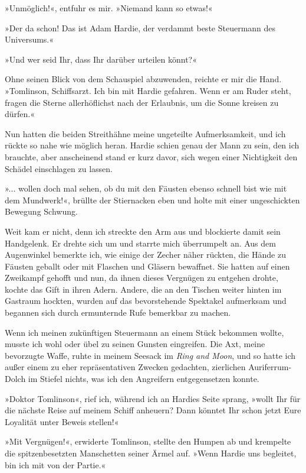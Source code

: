 »Unmöglich!«, entfuhr es mir. »Niemand kann so etwas!«

»Der da schon! Das ist Adam Hardie, der verdammt beste Steuermann
des Universums.«

»Und wer seid Ihr, dass Ihr darüber urteilen könnt?«

Ohne seinen Blick von dem Schauspiel abzuwenden, reichte er mir die
Hand. »Tomlinson, Schiffsarzt. Ich bin mit Hardie gefahren. Wenn er
am Ruder steht, fragen die Sterne allerhöflichst nach der
Erlaubnis, um die Sonne kreisen zu dürfen.«

\bigpar

Nun hatten die beiden Streithähne meine ungeteilte Aufmerksamkeit,
und ich rückte so nahe wie möglich heran. Hardie schien genau der
Mann zu sein, den ich brauchte, aber anscheinend stand er kurz
davor, sich wegen einer Nichtigkeit den Schädel einschlagen zu
lassen.

»... wollen doch mal sehen, ob du mit den Fäusten ebenso schnell
bist wie mit dem Mundwerk!«, brüllte der Stiernacken eben und holte
mit einer ungeschickten Bewegung Schwung.

Weit kam er nicht, denn ich streckte den Arm aus und blockierte
damit sein Handgelenk. Er drehte sich um und starrte mich
überrumpelt an. Aus dem Augenwinkel bemerkte ich, wie einige der
Zecher näher rückten, die Hände zu Fäusten geballt oder mit
Flaschen und Gläsern bewaffnet. Sie hatten auf einen Zweikampf
gehofft und nun, da ihnen dieses Vergnügen zu entgehen drohte,
kochte das Gift in ihren Adern. Andere, die an den Tischen weiter
hinten im Gastraum hockten, wurden auf das bevorstehende Spektakel
aufmerksam und begannen sich durch ermunternde Rufe bemerkbar zu
machen.

Wenn ich meinen zukünftigen Steuermann an einem Stück bekommen
wollte, musste ich wohl oder übel zu seinen Gunsten eingreifen. Die
Axt, meine bevorzugte Waffe, ruhte in meinem Seesack im
\emph{Ring and Moon}, und so hatte ich außer einem zu eher
repräsentativen Zwecken gedachten, zierlichen Auriferrum-Dolch im
Stiefel nichts, was ich den Angreifern entgegensetzen konnte.

»Doktor Tomlinson«, rief ich, während ich an Hardies Seite sprang,
»wollt Ihr für die nächste Reise auf meinem Schiff anheuern? Dann
könntet Ihr schon jetzt Eure Loyalität unter Beweis stellen!«

»Mit Vergnügen!«, erwiderte Tomlinson, stellte den Humpen ab und
krempelte die spitzenbesetzten Manschetten seiner Ärmel auf. »Wenn
Hardie uns begleitet, bin ich mit von der Partie.«

